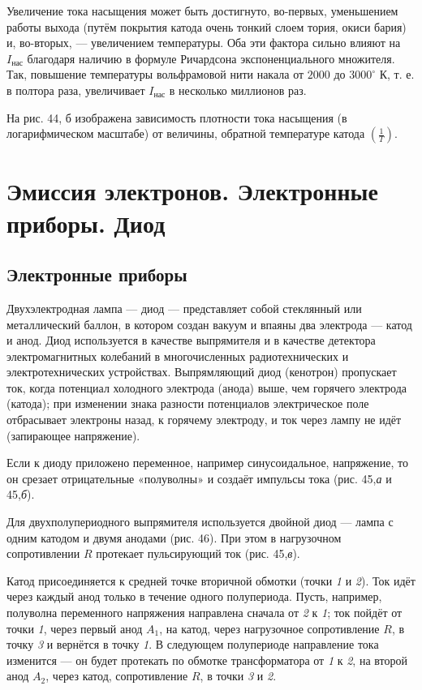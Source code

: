 \documentclass[a4paper,10pt]{book}
\begin{document}
Увеличение тока насыщения может быть достигнуто, во-первых, уменьшением работы выхода (путём покрытия катода очень тонкий слоем тория, окиси бария) и, во-вторых, — увеличением температуры. Оба эти фактора сильно влияют на $I_\text{нас}$ благодаря наличию в формуле Ричардсона экспоненциального множителя. Так, повышение температуры вольфрамовой нити накала от $2000$ до $3000^{\circ}\text{ К}$, т. е. в полтора раза, увеличивает $I_\text{нас}$ в несколько миллионов раз.

На рис. 44, б изображена зависимость плотности тока насыщения (в логарифмическом масштабе) от величины, обратной температуре катода $(\frac{1}{T})$.


\chapter{Эмиссия электронов. Электронные приборы. Диод}
\section{Электронные приборы}
Двухэлектродная лампа — диод — представляет собой стеклянный или металлический баллон, в котором создан вакуум и впаяны два электрода — катод и анод. Диод используется в качестве выпрямителя и в качестве детектора электромагнитных колебаний в многочисленных радиотехнических и электротехнических устройствах. Выпрямляющий диод (кенотрон) пропускает ток, когда потенциал холодного электрода (анода) выше, чем горячего электрода (катода); при изменении знака разности потенциалов электрическое поле отбрасывает электроны назад, к горячему электроду, и ток через лампу не идёт (запирающее напряжение).

Если к диоду приложено переменное, например синусоидальное, напряжение, то он срезает отрицательные «полуволны» и создаёт импульсы тока (рис. 45,\textit{а} и 45,\textit{б}).

Для двухполупериодного выпрямителя используется двойной диод — лампа с одним катодом и двумя анодами (рис. 46). При этом в нагрузочном сопротивлении $R$ протекает пульсирующий ток (рис. 45,\textit{в}). 

Катод присоединяется к средней точке вторичной обмотки (точки \textit{1} и \textit{2}). Ток идёт через каждый анод только в течение одного полупериода. Пусть, например, полуволна переменного напряжения направлена сначала от \textit{2} к \textit{1}; ток пойдёт от точки \textit{1}, через первый анод $A_1$, на катод, через нагрузочное сопротивление $R$, в точку \textit{3} и вернётся в точку \textit{1}. В следующем полупериоде направление тока изменится — он будет протекать по обмотке трансформатора от \textit{1} к \textit{2}, на второй анод $A_2$, через катод, сопротивление $R$, в точки \textit{3} и \textit{2}.
\end{document}
